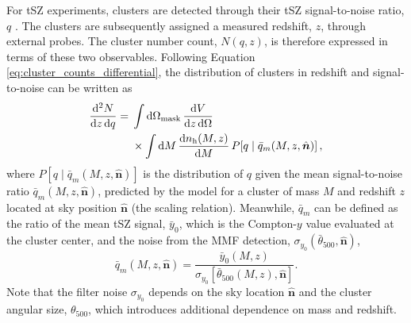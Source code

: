 \documentclass[aps,prd,twocolumn,superscriptaddress,nofootinbib,floatfix]{revtex4-2}
\begin{document}
For tSZ experiments, clusters are detected through their tSZ signal-to-noise ratio, $q$ \citep{Planck2015XXIV}. The clusters are subsequently assigned a measured redshift, $z$, through external probes. The cluster number count, $N(q,z)$, is therefore expressed in terms of these two observables. Following Equation \ref{eq:cluster_counts_differential}, the distribution of clusters in redshift and signal-to-noise can be written as
\begin{equation}
\begin{aligned}
\frac{\mathrm{d}^{2}N}
{\mathrm{d}z\,\mathrm{d}q}
={}&
\int
\mathrm{d}\Omega_{\rm mask}\,
\frac{\mathrm{d}V}
{\mathrm{d}z\,\mathrm{d}\Omega}
\\
&\times
\int \mathrm{d}M\,
\frac{\mathrm{d}n_{\mathrm{h}}(M,z)}
{\mathrm{d}M}\,
P\!\left[
q\mid\bar{q}_m(M,z,\hat{\bm{n}})
\right],
\end{aligned}
\label{eq:cluster_counts_qz}
\end{equation}
where $P\!\left[q\mid\bar{q}_m(M,z,\hat{\bm{n}})\right]$ is the distribution of $q$ given the mean signal-to-noise ratio $\bar{q}_m(M,z,\hat{\bm{n}})$, predicted by the model for a cluster of mass $M$ and redshift $z$ located at sky position $\hat{\bm{n}}$ (the scaling relation). Meanwhile, $\bar{q}_m$ can be defined as the ratio of the mean tSZ signal, $\bar{y}_0$, which is the Compton-$y$ value evaluated at the cluster center, and the noise from the MMF detection, $\sigma_{y_0}(\bar{\theta}_{500},\hat{\bm{n}})$,
\begin{equation}
\bar q_m(M,z,\hat{\bm n})
=
\frac{
\bar y_{0}(M,z)
}{
\sigma_{y_{0}}
\left[
\bar\theta_{500}(M,z),\hat{\bm n}
\right]
}.
\label{eq:mean_snr}
\end{equation}
Note that the filter noise $\sigma_{y_0}$ depends on the sky location $\hat{\bm{n}}$ and the cluster angular size, $\theta_{500}$, which introduces additional dependence on mass and redshift. 
\end{document}
